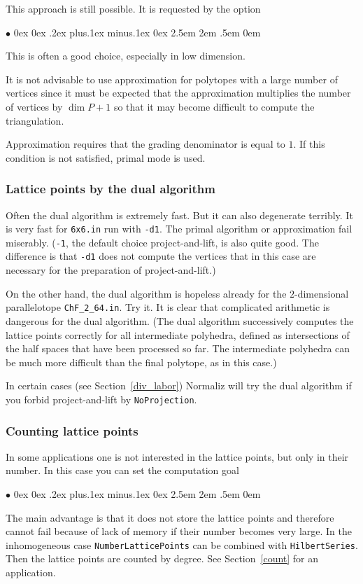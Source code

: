 \documentclass[12pt,a4paper]{scrartcl}
\newcommand{\stdli}{ \topsep0ex \partopsep0ex %
\parsep.2ex plus.1ex minus.1ex \itemsep0ex%
\leftmargin2.5em \labelwidth2em \labelsep.5em \rightmargin0em}%
\renewenvironment{itemize}{\begin{list}{{$\bullet$}}{\stdli}}{\end{list}}
\theoremstyle{definition}
\def\itemtt[#1]{\item[\textbf{\ttt{#1}}]}
\def\ttt{\texttt}
\begin{document}
This approach is still possible. It is requested by the option
\begin{itemize}
	\itemtt [Approximate, -r]
\end{itemize}

This is often a good choice, especially in low dimension.

It is not advisable to use approximation for polytopes with a large number of vertices since it must be expected that the approximation multiplies the number of vertices by $\dim P+1$ so that it may become difficult to compute the triangulation.

Approximation requires that the grading denominator is equal to $1$. If this condition is not satisfied, primal mode is used.

\subsubsection{Lattice points by the dual algorithm}

Often the dual algorithm is extremely fast. But it can also degenerate terribly. It is very fast for \verb|6x6.in| run with \verb|-d1|. The primal algorithm or approximation fail miserably. (\verb|-1|, the default choice project-and-lift, is also quite good. The difference is that \verb|-d1| does not compute the vertices that in this case are necessary for the preparation of project-and-lift.)

On the other hand, the dual algorithm is hopeless already for the $2$-dimensional parallelotope \verb|ChF_2_64.in|. Try it. It is clear that complicated arithmetic is dangerous for the dual algorithm. (The dual algorithm successively computes the lattice points correctly for all intermediate polyhedra, defined as intersections of the half spaces that have been processed so far. The intermediate polyhedra can be much more difficult than the final polytope, as in this case.)

In certain cases (see Section~\ref{div_labor}) Normaliz will try the dual algorithm if you forbid project-and-lift by \verb|NoProjection|.

\subsubsection{Counting lattice points}\label{Counting}

In some applications one is not interested in the lattice points, but only in their number. In this case you can set the computation goal
\begin{itemize}
	\itemtt [NumberLatticePoints]
\end{itemize}
The main advantage is that it does not store the lattice points and therefore cannot fail because of lack of memory if their number becomes very large. In the inhomogeneous case \verb|NumberLatticePoints| can be combined with \verb|HilbertSeries|. Then the lattice points are counted by degree. See Section~\ref{count} for an application.
\end{document}
